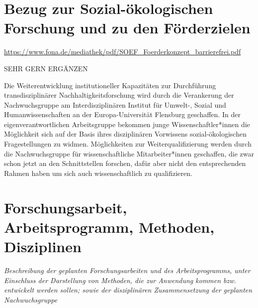 \documentclass[a4paper,11pt,twoside]{scrartcl}
\begin{document}
\section{Bezug zur Sozial-ökologischen Forschung und zu den Förderzielen}

\url{https://www.fona.de/mediathek/pdf/SOEF_Foerderkonzept_barrierefrei.pdf}

SEHR GERN ERGÄNZEN


Die Weiterentwicklung institutioneller Kapazitäten zur Durchführung transdisziplinärer Nachhaltigkeitsforschung wird durch die Verankerung der Nachwuchsgruppe am Interdisziplinären Institut für Umwelt-, Sozial und Humanwissenschaften an der Europa-Universität Flensburg geschaffen. In der eigenverantwortlichen Arbeitsgruppe bekommen junge Wissenschaftler*innen die Möglichkeit sich auf der Basis ihres disziplinären Vorwissens sozial-ökologischen Fragestellungen zu  widmen. Möglichkeiten zur Weiterqualifizierung werden durch die  Nachwuchsgruppe für wissenschaftliche Mitarbeiter*innen geschaffen, die zwar schon jetzt an den Schnittstellen forschen, dafür aber nicht den entsprechenden Rahmen haben um sich auch wissenschaftlich zu qualifizieren.


\section{Forschungsarbeit, Arbeitsprogramm, Methoden, Disziplinen}
\textit{Beschreibung der geplanten Forschungsarbeiten und des Arbeitsprogramms, unter Einschluss der Darstellung von Methoden, die zur Anwendung kommen bzw. entwickelt werden sollen; sowie der disziplinären Zusammensetzung der geplanten Nachwuchsgruppe}

\end{document}
